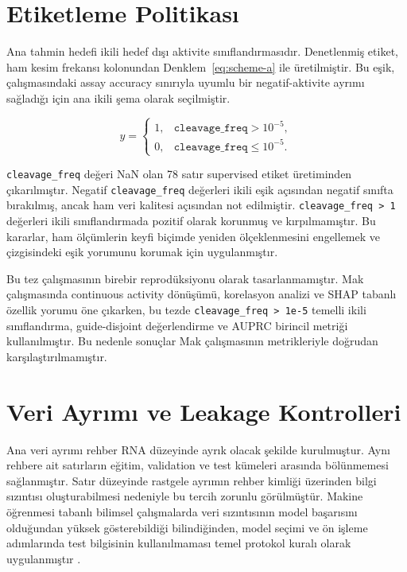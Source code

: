 \section{Etiketleme Politikası}

Ana tahmin hedefi ikili hedef dışı aktivite sınıflandırmasıdır. Denetlenmiş etiket, ham kesim frekansı kolonundan Denklem~\ref{eq:scheme-a} ile üretilmiştir. Bu eşik,  çalışmasındaki assay accuracy sınırıyla uyumlu bir negatif-aktivite ayrımı sağladığı için ana ikili şema olarak seçilmiştir.

\begin{equation}
y =
\begin{cases}
1, & \texttt{cleavage\_freq} > 10^{-5},\\
0, & \texttt{cleavage\_freq} \leq 10^{-5}.
\end{cases}
\label{eq:scheme-a}
\end{equation}

\texttt{cleavage\_freq} değeri NaN olan 78 satır supervised etiket üretiminden çıkarılmıştır. Negatif \texttt{cleavage\_freq} değerleri ikili eşik açısından negatif sınıfta bırakılmış, ancak ham veri kalitesi açısından not edilmiştir. \texttt{cleavage\_freq > 1} değerleri ikili sınıflandırmada pozitif olarak korunmuş ve kırpılmamıştır. Bu kararlar, ham ölçümlerin keyfi biçimde yeniden ölçeklenmesini engellemek ve  çizgisindeki eşik yorumunu korumak için uygulanmıştır.

Bu tez  çalışmasının birebir reprodüksiyonu olarak tasarlanmamıştır. Mak çalışmasında continuous activity dönüşümü, korelasyon analizi ve SHAP tabanlı özellik yorumu öne çıkarken, bu tezde \texttt{cleavage\_freq > 1e-5} temelli ikili sınıflandırma, guide-disjoint değerlendirme ve AUPRC birincil metriği kullanılmıştır. Bu nedenle sonuçlar Mak çalışmasının metrikleriyle doğrudan karşılaştırılmamıştır.

\section{Veri Ayrımı ve Leakage Kontrolleri}

Ana veri ayrımı rehber RNA düzeyinde ayrık olacak şekilde kurulmuştur. Aynı rehbere ait satırların eğitim, validation ve test kümeleri arasında bölünmemesi sağlanmıştır. Satır düzeyinde rastgele ayrımın rehber kimliği üzerinden bilgi sızıntısı oluşturabilmesi nedeniyle bu tercih zorunlu görülmüştür. Makine öğrenmesi tabanlı bilimsel çalışmalarda veri sızıntısının model başarısını olduğundan yüksek gösterebildiği bilindiğinden, model seçimi ve ön işleme adımlarında test bilgisinin kullanılmaması temel protokol kuralı olarak uygulanmıştır .

